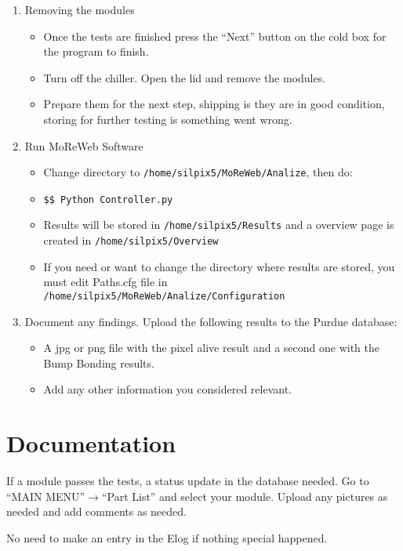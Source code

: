 \documentclass[12pt]{unlsilabsop}
\begin{document}
\begin{enumerate}
   \item Removing the modules
   \begin{itemize}
   		\item Once the tests are finished press the ``Next'' button on the cold box for the program to finish.
   		\item Turn off the chiller. Open the lid and remove the modules.
   		\item Prepare them for the next step, shipping is they are in good condition, storing for further testing is something went wrong.
	\end{itemize} 
	 \item Run MoReWeb Software
    \begin{itemize}
    		\item Change directory to \texttt{/home/silpix5/MoReWeb/Analize}, then do:
    		\item \texttt{\$\$ Python Controller.py}
    		\item Results will be stored in \texttt{/home/silpix5/Results} and a overview page is created in \texttt{/home/silpix5/Overview}
    		\item If you need or want to change the directory where results are stored, you must edit Paths.cfg file in \texttt{/home/silpix5/MoReWeb/Analize/Configuration}
   \end{itemize}  	
    \item Document any findings. Upload the following results to the Purdue database:
    \begin{itemize}
    		\item A jpg or png file with the pixel alive result and a second one with the Bump Bonding results.
    		\item Add any other information you considered relevant.
    \end{itemize}
\end{enumerate}

\section{Documentation}
If a module passes the tests, a status update in the database needed. Go to ``MAIN MENU''$\rightarrow$``Part List'' and select your module. Upload any pictures as needed and add comments as needed.

No need to make an entry in the Elog if nothing special happened.
\end{document}
